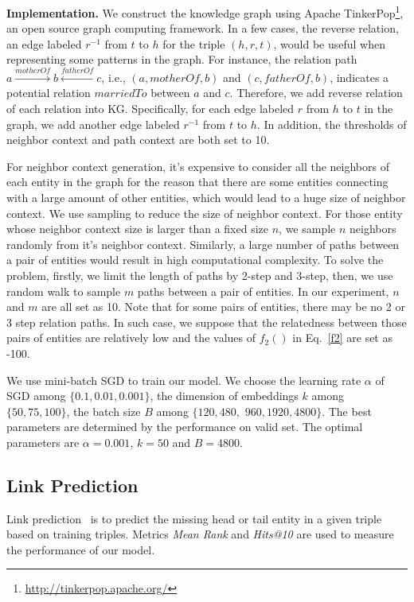 \textbf{Implementation.}
We construct the knowledge graph using Apache TinkerPop\footnote{\url{http://tinkerpop.apache.org/}}, an open source graph computing framework. In a few cases, the reverse relation, an edge labeled $r^{-1}$ from $t$ to $h$ for the triple $(h,r,t)$, would be useful when representing some patterns in the graph. For instance, the relation path $a \xrightarrow{motherOf} b \xleftarrow{fatherOf} c$, i.e., $(a, motherOf, b)$ and $(c, fatherOf, b)$, indicates a potential relation $marriedTo$ between $a$ and $c$. Therefore, we add reverse relation of each relation into KG. Specifically, for each edge labeled $r$ from $h$ to $t$ in the graph, we add another edge labeled $r^{-1}$ from $t$ to $h$. In addition, the thresholds of neighbor context and path context are both set to 10.

For neighbor context generation, it's expensive to consider all the neighbors of each entity in the graph for the reason that there are some entities connecting with a large amount of other entities, which would lead to a huge size of neighbor context. We use sampling to reduce the size of neighbor context. For those entity whose neighbor context size is larger than a fixed size $n$, we sample $n$ neighbors randomly from it's neighbor context. Similarly, a large number of paths between a pair of entities would result in high computational complexity. To solve the problem, firstly, we limit the length of paths by 2-step and 3-step, then, we use random walk to sample $m$ paths between a pair of entities. In our experiment, $n$ and $m$ are all set as 10. Note that for some pairs of entities, there may be no 2 or 3 step relation paths. In such case, we suppose that the relatedness between those pairs of entities are relatively low and the values of $f_2()$ in Eq.~\eqref{f2} are set as -100.


We use mini-batch SGD to train our model. We choose the learning rate $\alpha$ of SGD among $\{0.1, 0.01, 0.001\}$, the dimension of embeddings $k$ among $\{50, 75, 100\}$, the batch size $B$ among $\{120, 480,$ $ 960, 1920, 4800\}$. The best parameters are determined by the performance on valid set. The optimal parameters are $\alpha=0.001$, $k=50$ and $B=4800$.

\subsection{Link Prediction}
Link prediction~\cite{BordesUGWY13} is to predict the missing head or tail entity in a given triple based on training triples. Metrics \textit{Mean Rank} and \textit{Hits@10} are used to measure the performance of our model.


